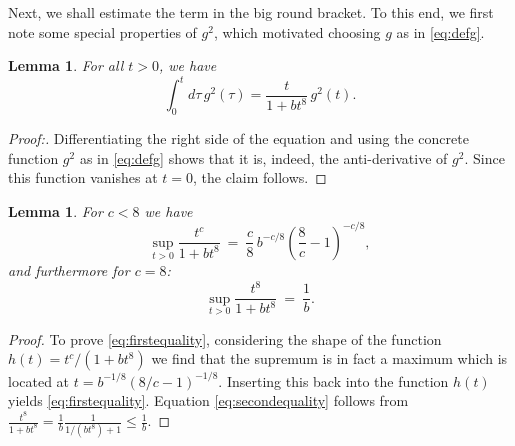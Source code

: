\documentclass[b5paper,draft,openbib,12pt]{memoir}
\newtheorem{Lemma}[Def]{Lemma}
\begin{document}
Next, we shall estimate the term in the big round bracket. To this 
end, we first note some special properties of \(g^2\), which 
motivated choosing $g$ as in \eqref{eq:defg}.
\begin{Lemma}\label{lem:int}
 For all \(t>0\), we have
\begin{equation}
	\int_0^t d\tau \, g^2(\tau) = \frac{t}{1+b t^8} \, g^2(t).
\end{equation}
\end{Lemma}
\begin{proof}[Proof:] Differentiating the right side of the equation 
  and using the concrete function \(g^2\) as in \eqref{eq:defg} shows 
  that it is, indeed, the anti-derivative of \(g^2\). Since this 
  function vanishes at \(t=0\), the claim follows. 
\end{proof}

\begin{Lemma}\label{lem:someidentities}
For $c<8$ we have
\begin{equation}
	\sup_{t>0} \frac{t^c}{1+b t^8}  ~=~\frac{c}{8}\,  b^{-c/8} \left( \frac{8}{c}-1\right)^{-c/8},
	\label{eq:firstequality}
\end{equation}
and furthermore for $c=8$:
\begin{equation}
	\sup_{t>0} \frac{t^8}{1+b t^8} ~=~\frac{1}{b}.
	\label{eq:secondequality}
\end{equation}
\end{Lemma}

\begin{proof}
To prove \eqref{eq:firstequality}, considering the shape of the 
function $h(t)= t^c/(1+b t^8)$ we find that the supremum is in 
fact a maximum which is located at 
\(t = b^{-1/8} \left(8/c-1\right)^{-1/8}\). Inserting this back into 
the function $h(t)$ yields \eqref{eq:firstequality}.  
Equation \eqref{eq:secondequality} follows from 
$\frac{t^8}{1+b t^8} = \frac{1}{b} \frac{1}{1/(b t^8) +1} \leq 
\frac{1}{b}$. 
\end{proof}
\end{document}
